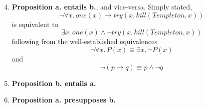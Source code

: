\documentclass[12pt,a4paper]{article}
\begin{document}
\part{}
\begin{enumerate}
\setcounter{enumi}{3}
\item \textbf{Proposition a. entails b.}, and vice-versa. Simply stated,
\[
\neg \forall x.\, one(x) \rightarrow try(x, kill(Templeton, x))
\]
is equivalent to
\[
\exists x.\, one(x) \wedge \neg try(x, kill(Templeton, x))
\]
following from the well-established equivalences
\[
\neg \forall x.\, P(x) \equiv \exists x.\, \neg P(x)
\]
and
\[
\neg (p \rightarrow q) \equiv p \wedge \neg q
\]

\item \textbf{Proposition b. entails a.}

\item \textbf{Proposition a. presupposes b.}
\end{enumerate}

\part{}
\end{document}
